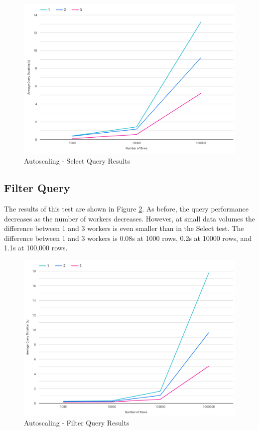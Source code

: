 \begin{figure}[ht]
	\centering
	\includegraphics[width=0.8\linewidth]{chapters/diagrams/testing/select-simple-autoscale-test}
	\caption{Autoscaling - Select Query Results}
	\label{fig:select-simple-autoscale-test}
\end{figure}

\subsection{Filter Query}
The results of this test are shown in Figure \ref{fig:filter-simple-autoscale-test}. As before, the query performance decreases as the number of workers decreases. However, at small data volumes the difference between 1 and 3 workers is even smaller than in the Select test. The difference between 1 and 3 workers is 0.08s at 1000 rows, 0.2s at 10000 rows, and 1.1s at 100,000 rows.

\begin{figure}[ht]
	\centering
	\includegraphics[width=0.8\linewidth]{chapters/diagrams/testing/filter-simple-autoscale-test}
	\caption{Autoscaling - Filter Query Results}
	\label{fig:filter-simple-autoscale-test}
\end{figure}

